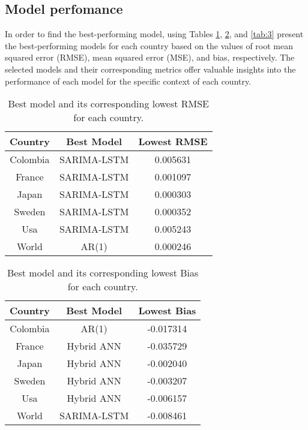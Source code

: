 \documentclass[hidelinks,11pts]{article}
\DeclareMathOperator{\1}{\mathbbm{1}}
\begin{document}


\subsection{Model perfomance}
In order to find the best-performing model, using Tables \ref{tab:1}, \ref{tab:2}, and \ref{tab:3} present the best-performing models for each country based on the values of root mean squared error (RMSE), mean squared error (MSE), and bias, respectively. The selected models and their corresponding metrics offer valuable insights into the performance of each model for the specific context of each country.


\begin{table}[h]
\centering
\begin{tabular}{|c|c|c|}
\hline
\textbf{Country} & \textbf{Best Model} & \textbf{Lowest RMSE} \\
\hline
Colombia & SARIMA-LSTM & 0.005631 \\
France & SARIMA-LSTM & 0.001097 \\
Japan & SARIMA-LSTM & 0.000303 \\
Sweden & SARIMA-LSTM & 0.000352 \\
Usa & SARIMA-LSTM & 0.005243 \\
World & AR(1) & 0.000246 \\
\hline
\end{tabular}
\caption{Best model and its corresponding lowest RMSE for each country.}
\label{tab:1}
\end{table}

\begin{table}[h]
\centering
\begin{tabular}{|c|c|c|}
\hline
\textbf{Country} & \textbf{Best Model} & \textbf{Lowest Bias} \\
\hline
Colombia & AR(1) & -0.017314 \\
France & Hybrid ANN & -0.035729 \\
Japan & Hybrid ANN & -0.002040 \\
Sweden & Hybrid ANN & -0.003207 \\
Usa & Hybrid ANN & -0.006157 \\
World & SARIMA-LSTM & -0.008461 \\
\hline
\end{tabular}
\caption{Best model and its corresponding lowest Bias for each country.}
\label{tab:2}
\end{table}
\end{document}
